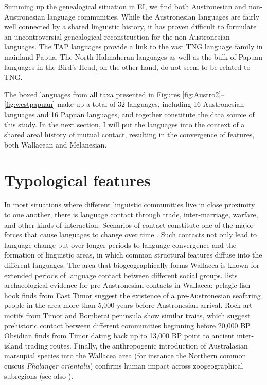 Summing up the genealogical situation in EI, we find both Austronesian and non-Austronesian language communities. While the Austronesian languages are fairly well connected by a shared linguistic history, it has proven difficult to formulate an uncontroversial genealogical reconstruction for the non-Austronesian languages. The TAP languages provide a link to the vast TNG language family in mainland Papua. The North Halmaheran languages as well as the bulk of Papuan languages in the Bird's Head, on the other hand, do not seem to be related to TNG. 

The boxed languages from all taxa presented in Figures \ref{fig:Austro2}--\ref{fig:westpapuan} make up a total of 32 languages, including 16 Austronesian languages and 16 Papuan languages, and together constitute the data source of this study. In the next section, I will put the languages into the context of a shared areal history of mutual contact, resulting in the convergence of features, both Wallacean and Melanesian.

\section{Typological features}\label{sec:typo}
\largerpage[1]
In most situations where different linguistic communities live in close proximity to one another, there is language contact through trade, inter-marriage, warfare, and other kinds of interaction. Scenarios of contact constitute one of the major forces that cause languages to change over time \citep{thomason2001language}. Such contacts not only lead to language change but over longer periods to language convergence and the formation of linguistic areas, in which common structural features diffuse into the different languages. The area that biogeographically forms Wallacea is known for extended periods of language contact between different social groups. \citet[141f.]{schapper2015wallacea} lists archaeological evidence for pre-Austronesian contacts in Wallacea: pelagic fish hook finds from East Timor suggest the existence of a pre-Austronesian seafaring people in the area more than 5,000 years before Austronesian arrival. Rock art motifs from Timor and Bomberai peninsula show similar traits, which suggest prehistoric contact between different communities beginning before 20,000 BP. Obsidian finds from Timor dating back up to 13,000 BP point to ancient inter-island trading routes. Finally, the anthropogenic introduction of Australasian marsupial species into the Wallacea area (for instance the Northern common cuscus \textit{Phalanger orientalis}) confirms human impact across zoogeographical subregions (see also \citealt{Heinsohn2010}).


